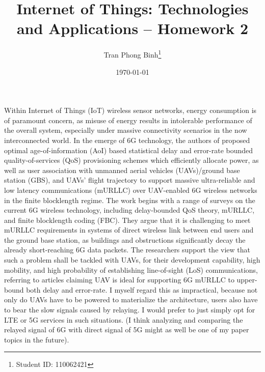 \documentclass[12pt, a4paper, onside]{article}
\title{\textbf{Internet of Things: Technologies and Applications -- Homework 2}}
\author{Tran Phong Binh\thanks{Student ID: 110062421}}
\affil{Department of Computer Science, National Tsing Hua University}
\date{\today}
\begin{document}
\maketitle

Within Internet of Things (IoT) wireless sensor networks, energy consumption is of paramount concern, as misuse of energy results in intolerable performance of the overall system, especially under massive connectivity scenarios in the now interconnected world. In the emerge of 6G technology, the authors of \cite{6gstatistical} proposed optimal age-of-information (AoI) based statistical delay and error-rate bounded quality-of-services (QoS) provisioning schemes which efficiently allocate power, as well as user association with unmanned aerial vehicles (UAVs)/ground base station (GBS), and UAVs' flight trajectory to support massive ultra-reliable and low latency communications (mURLLC) over UAV-enabled 6G wireless networks in the finite blocklength regime. The work begins with a range of surveys on the current 6G wireless technology, including delay-bounded QoS theory, mURLLC, and finite blocklength coding (FBC). They argue that it is challenging to meet mURLLC requirements in systems of direct wireless link between end users and the ground base station, as buildings and obstructions significantly decay the already short-reaching 6G data packets. The researchers support the view that such a problem shall be tackled with UAVs, for their development capability, high mobility, and high probability of establishing line-of-sight (LoS) communications, referring to articles claiming UAV is ideal for supporting 6G mURLLC to upper-bound both delay and error-rate. I myself regard this as impractical, because not only do UAVs have to be powered to materialize the architecture, users also have to bear the slow signals caused by relaying. I would prefer to just simply opt for LTE or 5G services in such situations. (I think analyzing and comparing the relayed signal of 6G with direct signal of 5G might as well be one of my paper topics in the future).
\end{document}
